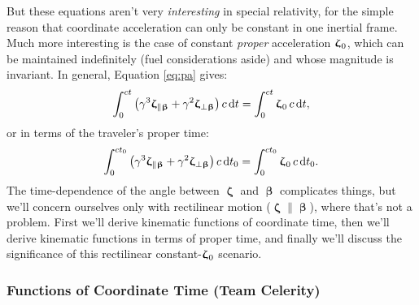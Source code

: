 \documentclass[12pt]{article}
\newcommand{\dd}[1]{\mathrm{d}#1}
\newcommand{\vvbeta}{\bm{\upbeta}}
\newcommand{\vvzeta}{\bm{\upzeta}}
\begin{document}
But these equations aren't very \emph{interesting} in special relativity, for the simple reason that coordinate acceleration can only be constant in one inertial frame. Much more interesting is the case of constant \emph{proper} acceleration $\vvzeta_{\mkern1mu 0}$, which can be maintained indefinitely (fuel considerations aside) and whose magnitude is invariant. In general, Equation \ref{eq:pa} gives:
\begin{equation*}
\int_0^{ct} \left( \gamma^3 \vvzeta_{\parallel \vvbeta} + \gamma^2 \vvzeta_{\perp \vvbeta} \right) c \, \dd t = \int_0^{ct} \vvzeta_{\mkern1mu 0} \, c \, \dd t ,
\end{equation*}
or in terms of the traveler's proper time:
\begin{equation*}
\int_0^{ct_0} \left( \gamma^3 \vvzeta_{\parallel \vvbeta} + \gamma^2 \vvzeta_{\perp \vvbeta} \right) c \, \dd t_0 = \int_0^{ct_0} \vvzeta_{\mkern1mu 0} \, c \, \dd t_0 .
\end{equation*}
The time-dependence of the angle between $\vvzeta$ and $\vvbeta$ complicates things, but we'll concern ourselves only with rectilinear motion ($\vvzeta \parallel \vvbeta$), where that's not a problem. First we'll derive kinematic functions of coordinate time, then we'll derive kinematic functions in terms of proper time, and finally we'll discuss the significance of this rectilinear constant-$\vvzeta_{\mkern1mu 0}$ scenario.


\subsubsection{Functions of Coordinate Time (Team Celerity)}
\end{document}
